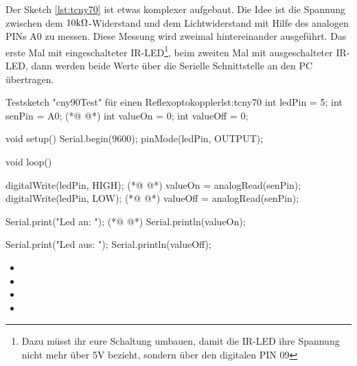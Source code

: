 Der Sketch \ref{lst:tcny70} ist etwas komplexer aufgebaut. Die Idee ist die Spannung zwischen
dem $10\text{k}\Omega$-Widerstand und dem Lichtwiderstand mit Hilfe des analogen PINs A0 zu messen.
Diese Messung wird zweimal hintereinander ausgeführt. Das erste Mal mit eingeschalteter IR-LED\footnote{Dazu müsst ihr eure Schaltung umbauen, damit die IR-LED ihre Spannung nicht mehr über 5V bezieht, sondern über den digitalen PIN 09}, beim zweiten Mal mit ausgeschalteter IR-LED, dann werden beide Werte über die Serielle Schnittstelle an den PC übertragen. 
\begin{multicols}{2}
\begin{arduinoCode}{Testsketch "cny90Test" für einen Reflexoptokoppler}{lst:tcny70}
int ledPin = 5;
int senPin = A0; (*@  @*)
int valueOn = 0; 
int valueOff = 0;

 void setup()
{
  Serial.begin(9600);      
  pinMode(ledPin, OUTPUT);
}

void loop()
{
  digitalWrite(ledPin, HIGH); (*@  @*)
  valueOn = analogRead(senPin); 
  digitalWrite(ledPin, LOW); (*@  @*)
  valueOff = analogRead(senPin);

  Serial.print("Led an:  "); (*@  @*)
  Serial.println(valueOn);   
 
  Serial.print("Led aus: ");
  Serial.println(valueOff);
}
\end{arduinoCode}
\vfill\null 
\columnbreak
\null\vfill 
\begin{itemize}
  \itemsep15pt
  \item[] 
  \itemsep100pt
  \item[] 
  \itemsep15pt
  \item[] 
  \item[] 
  \itemsep15pt
\end{itemize}
\vfill \null

\end{multicols}

